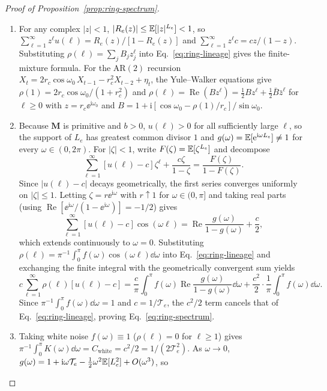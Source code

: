 \begin{proof}[Proof of Proposition~{\upshape\ref{prop:ring-spectrum}}]
\begin{enumerate}
\item[(a)] For any complex $|z| < 1$, $|R_e(z)| \le \mathbb{E}[|z|^{L_e}] < 1$, so $\sum_{\ell=1}^{\infty} z^\ell u(\ell) = R_e(z)/[1 - R_e(z)]$ and $\sum_{\ell=1}^{\infty} z^\ell c = cz/(1 - z)$. Substituting $\rho(\ell) = \sum_j B_j z_j^\ell$ into Eq.~\eqref{eq:ring-lineage} gives the finite-mixture formula. For the $\mathrm{AR}(2)$ recursion $X_t = 2r_c\cos\omega_0\,X_{t-1} - r_c^2 X_{t-2} + \eta_t$, the Yule--Walker equations give $\rho(1) = 2r_c\cos\omega_0/(1 + r_c^2)$ and $\rho(\ell) = \operatorname{Re}(B z^\ell) = \frac{1}{2}B z^\ell + \frac{1}{2}\bar{B}\bar{z}^\ell$ for $\ell \ge 0$ with $z = r_c\ee^{\mathrm{i}\omega_0}$ and $B = 1 + \mathrm{i}[\cos\omega_0 - \rho(1)/r_c]/\sin\omega_0$.
\item[(b)] Because $\mathbf{M}$ is primitive and $b > 0$, $u(\ell) > 0$ for all sufficiently large $\ell$, so the support of $L_e$ has greatest common divisor $1$ and $g(\omega) = \mathbb{E}[\mathrm{e}^{\mathrm{i}\omega L_e}] \ne 1$ for every $\omega \in (0, 2\pi)$. For $|\zeta| < 1$, write $F(\zeta) = \mathbb{E}[\zeta^{L_e}]$ and decompose
\[
\sum_{\ell=1}^{\infty} [u(\ell) - c]\zeta^\ell + \frac{c\zeta}{1 - \zeta} = \frac{F(\zeta)}{1 - F(\zeta)}.
\]
Since $|u(\ell) - c|$ decays geometrically, the first series converges uniformly on $|\zeta| \le 1$. Letting $\zeta = r\ee^{\mathrm{i}\omega}$ with $r \uparrow 1$ for $\omega \in (0, \pi]$ and taking real parts (using $\operatorname{Re}[\ee^{\mathrm{i}\omega}/(1 - \ee^{\mathrm{i}\omega})] = -1/2$) gives
\[
\sum_{\ell=1}^{\infty} [u(\ell) - c]\cos(\omega\ell) = \operatorname{Re}\frac{g(\omega)}{1 - g(\omega)} + \frac{c}{2},
\]
which extends continuously to $\omega = 0$. Substituting $\rho(\ell) = \pi^{-1}\int_0^\pi f(\omega)\cos(\omega\ell)\dd\omega$ into Eq.~\eqref{eq:ring-lineage} and exchanging the finite integral with the geometrically convergent sum yields
\[
c\sum_{\ell=1}^{\infty} \rho(\ell)[u(\ell) - c] = \frac{c}{\pi}\int_0^\pi f(\omega)\operatorname{Re}\frac{g(\omega)}{1 - g(\omega)}\dd\omega + \frac{c^2}{2}\cdot\frac{1}{\pi}\int_0^\pi f(\omega)\dd\omega.
\]
Since $\pi^{-1}\int_0^\pi f(\omega)\dd\omega = 1$ and $c = 1/\mathcal{T}_e$, the $c^2/2$ term cancels that of Eq.~\eqref{eq:ring-lineage}, proving Eq.~\eqref{eq:ring-spectrum}.
\item[(c)] Taking white noise $f(\omega) \equiv 1$ ($\rho(\ell) = 0$ for $\ell \ge 1$) gives $\pi^{-1}\int_0^\pi K(\omega)\dd\omega = C_{\mathrm{white}} = c^2/2 = 1/(2\mathcal{T}_e^2)$. As $\omega \to 0$, $g(\omega) = 1 + \mathrm{i}\omega\mathcal{T}_e - \frac{1}{2}\omega^2\mathbb{E}[L_e^2] + O(\omega^3)$, so

\end{enumerate}
\end{proof}
